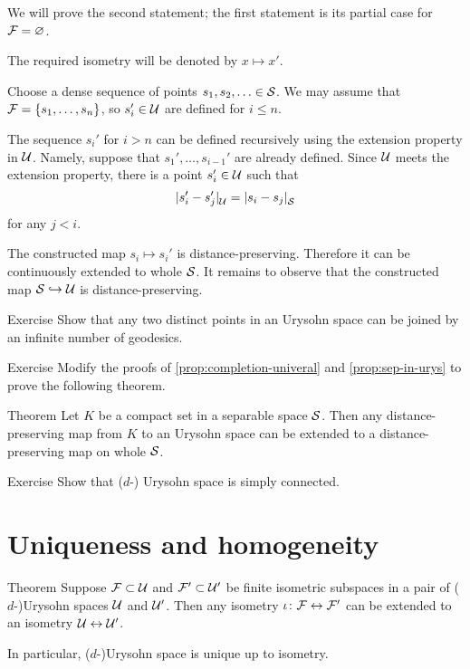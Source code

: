 We will prove the second statement;
the first statement is its partial case for $\mathcal{F}=\varnothing$.

The required isometry will be denoted by $x\mapsto x'$.

Choose a dense sequence of points $s_1,s_2,\dotsc\in\mathcal{S}$.
We may assume that $\mathcal{F}=\{s_1,\dots,s_n\}$, so $s_i'\in \mathcal{U}$ are defined for $i\le n$.

The sequence $s_i'$ for $i>n$ can be defined recursively using the extension property in $\mathcal{U}$.
Namely, suppose that $s_1',\dots,s_{i-1}'$ are already defined.
Since $\mathcal{U}$ meets the extension property, there is a point $s_i'\in \mathcal{U}$ such that
\[\dist{s_i'}{s_j'}{\spc{U}}=\dist{s_i}{s_j}{\spc{S}}\]
for any $j<i$.

The constructed map $s_i\mapsto s_i'$ is distance-preserving.
Therefore it can be continuously extended to whole $\mathcal{S}$.
It remains to observe that the constructed map $\mathcal{S}\hookrightarrow\mathcal{U}$ is distance-preserving.
\qeds

\begin{thm}{Exercise}\label{ex:geodesics-urysohn}
Show that any two distinct points in an Urysohn space can be joined by an infinite number of geodesics.
\end{thm}

\begin{thm}{Exercise}\label{ex:compact-extension}
Modify the proofs of \ref{prop:completion-univeral} and \ref{prop:sep-in-urys} to prove the following theorem.
\end{thm}

\begin{thm}{Theorem}\label{thm:compact-extension}
Let $K$ be a compact set in a separable space $\mathcal{S}$.
Then any distance-preserving map from $K$ to an Urysohn space can be extended to 
a distance-preserving map on whole $\mathcal{S}$.
\end{thm}

\begin{thm}{Exercise}\label{ex:sc-urysohn}
Show that ($d$-) Urysohn space is simply connected.
\end{thm}

\section{Uniqueness and homogeneity}

\begin{thm}{Theorem}\label{thm:urysohn-unique}
Suppose $\mathcal{F}\subset \mathcal{U}$ and $\mathcal{F}'\subset \mathcal{U}'$ be finite isometric subspaces in a pair of ($d$-)Urysohn spaces $\mathcal{U}$ and $\mathcal{U}'$.
Then any isometry $\iota\colon\mathcal{F}\leftrightarrow \mathcal{F}'$ can be extended to an isometry $\mathcal{U}\leftrightarrow \mathcal{U}'$.

In particular, ($d$-)Urysohn space is unique up to isometry.
\end{thm}

